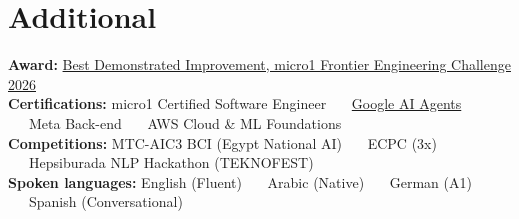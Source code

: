 \documentclass[10pt,a4paper]{article}
\newcommand{\sep}{\ \textbar\ \ }
\begin{document}
\section{Additional}
\textbf{Award:} \href{https://romia.dev/projects/advisorydrift}{Best Demonstrated Improvement, micro1 Frontier Engineering Challenge 2026} \\[2pt]
\textbf{Certifications:} micro1 Certified Software Engineer \sep \href{https://www.kaggle.com/certification/badges/abdelrahmanromia/105}{Google AI Agents} \sep Meta Back-end \sep AWS Cloud \& ML Foundations \\[2pt]
\textbf{Competitions:} MTC-AIC3 BCI (Egypt National AI) \sep ECPC (3x) \sep Hepsiburada NLP Hackathon (TEKNOFEST) \\[2pt]
\textbf{Spoken languages:} English (Fluent) \sep Arabic (Native) \sep German (A1) \sep Spanish (Conversational)
\end{document}
